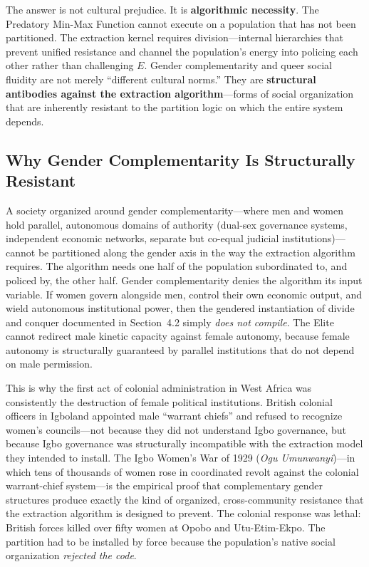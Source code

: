 \documentclass[12pt,openany]{book}
\begin{document}
The answer is not cultural prejudice. It is \textbf{algorithmic necessity}. The Predatory Min-Max Function cannot execute on a population that has not been partitioned. The extraction kernel requires division---internal hierarchies that prevent unified resistance and channel the population's energy into policing each other rather than challenging $E$. Gender complementarity and queer social fluidity are not merely ``different cultural norms.'' They are \textbf{structural antibodies against the extraction algorithm}---forms of social organization that are inherently resistant to the partition logic on which the entire system depends.

\subsection{Why Gender Complementarity Is Structurally Resistant}

A society organized around gender complementarity---where men and women hold parallel, autonomous domains of authority (dual-sex governance systems, independent economic networks, separate but co-equal judicial institutions)---cannot be partitioned along the gender axis in the way the extraction algorithm requires. The algorithm needs one half of the population subordinated to, and policed by, the other half. Gender complementarity denies the algorithm its input variable. If women govern alongside men, control their own economic output, and wield autonomous institutional power, then the gendered instantiation of divide and conquer documented in Section~4.2 simply \textit{does not compile}. The Elite cannot redirect male kinetic capacity against female autonomy, because female autonomy is structurally guaranteed by parallel institutions that do not depend on male permission.

This is why the first act of colonial administration in West Africa was consistently the destruction of female political institutions. British colonial officers in Igboland appointed male ``warrant chiefs'' and refused to recognize women's councils---not because they did not understand Igbo governance, but because Igbo governance was structurally incompatible with the extraction model they intended to install. The Igbo Women's War of 1929 (\textit{Ogu Umunwanyi})---in which tens of thousands of women rose in coordinated revolt against the colonial warrant-chief system---is the empirical proof that complementary gender structures produce exactly the kind of organized, cross-community resistance that the extraction algorithm is designed to prevent. The colonial response was lethal: British forces killed over fifty women at Opobo and Utu-Etim-Ekpo. The partition had to be installed by force because the population's native social organization \textit{rejected the code}.
\end{document}
